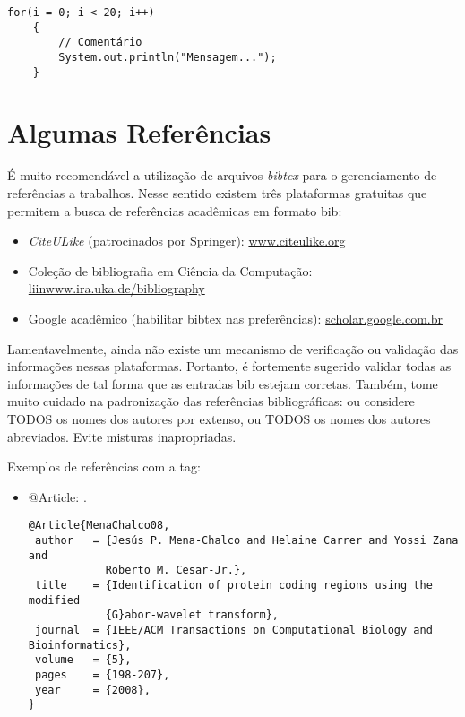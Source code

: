 \begin{lstlisting}[frame=trbl]
    for(i = 0; i < 20; i++)
    {
        // Comentário 
        System.out.println("Mensagem...");
    }
\end{lstlisting}


\section{Algumas Referências}
\label{sec:algumas_referencias}

É muito recomendável a utilização de arquivos \emph{bibtex} para o gerenciamento
de referências a trabalhos. Nesse sentido existem três plataformas gratuitas
que permitem a busca de referências acadêmicas em formato bib: 
\begin{itemize}
	\item \emph{CiteULike} (patrocinados por Springer): \url{www.citeulike.org}
	\item Coleção de bibliografia em Ciência da Computação: \url{liinwww.ira.uka.de/bibliography}
	\item Google acadêmico (habilitar bibtex nas preferências): \url{scholar.google.com.br}
\end{itemize}
Lamentavelmente, ainda não existe um mecanismo de verificação ou validação das
informações nessas plataformas. Portanto, é fortemente sugerido validar todas
as informações de tal forma que as entradas bib estejam corretas.  Também, tome
muito cuidado na padronização das referências bibliográficas: ou considere TODOS
os nomes dos autores por extenso, ou TODOS os nomes dos autores abreviados.
Evite misturas inapropriadas.

Exemplos de referências com a tag:
\begin{itemize}


\item @Article: \citep{MenaChalco08}.
{\scriptsize\begin{verbatim}
@Article{MenaChalco08,
 author   = {Jesús P. Mena-Chalco and Helaine Carrer and Yossi Zana and 
            Roberto M. Cesar-Jr.},
 title    = {Identification of protein coding regions using the modified 
            {G}abor-wavelet transform},
 journal  = {IEEE/ACM Transactions on Computational Biology and Bioinformatics},
 volume   = {5},
 pages    = {198-207},
 year     = {2008},
}
\end{verbatim}}


\end{itemize}

